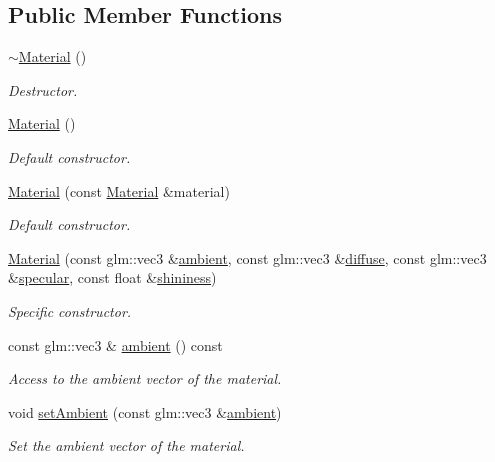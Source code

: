 \subsection*{Public Member Functions}
\begin{DoxyCompactItemize}
\item 
\hyperlink{classMaterial_a2c19452d71f54075df8f5405b03129f4}{$\sim$\+Material} ()
\begin{DoxyCompactList}\small\item\em Destructor. \end{DoxyCompactList}\item 
\hyperlink{classMaterial_a137e987401b63eb7c6c27c3e38bc74b5}{Material} ()
\begin{DoxyCompactList}\small\item\em Default constructor. \end{DoxyCompactList}\item 
\hyperlink{classMaterial_ac0731e51ea0d30bf45ddec3fe761062e}{Material} (const \hyperlink{classMaterial}{Material} \&material)
\begin{DoxyCompactList}\small\item\em Default constructor. \end{DoxyCompactList}\item 
\hyperlink{classMaterial_abe14a96ffa863f4797311436783c6dc8}{Material} (const glm\+::vec3 \&\hyperlink{classMaterial_a41c97ec67d40e331b1b9c9073a83291a}{ambient}, const glm\+::vec3 \&\hyperlink{classMaterial_a20d17721220c394d517fba384376b28b}{diffuse}, const glm\+::vec3 \&\hyperlink{classMaterial_abf83bcfb75295d0b666766b2b3e0150f}{specular}, const float \&\hyperlink{classMaterial_a115afa4cab211d366e96ad1e01dd5eed}{shininess})
\begin{DoxyCompactList}\small\item\em Specific constructor. \end{DoxyCompactList}\item 
const glm\+::vec3 \& \hyperlink{classMaterial_a41c97ec67d40e331b1b9c9073a83291a}{ambient} () const 
\begin{DoxyCompactList}\small\item\em Access to the ambient vector of the material. \end{DoxyCompactList}\item 
void \hyperlink{classMaterial_a225eaed59c1116881b9fcdb82c475641}{set\+Ambient} (const glm\+::vec3 \&\hyperlink{classMaterial_a41c97ec67d40e331b1b9c9073a83291a}{ambient})
\begin{DoxyCompactList}\small\item\em Set the ambient vector of the material. \end{DoxyCompactList}\item 

\end{DoxyCompactItemize}
